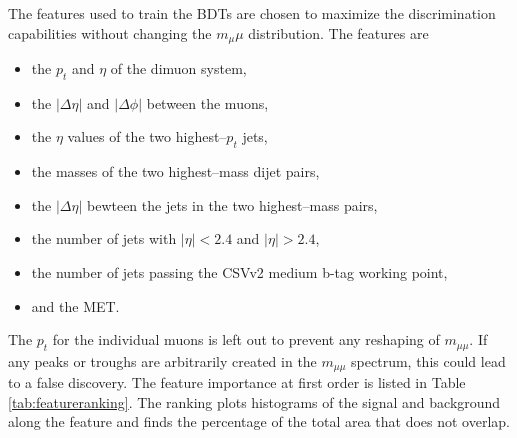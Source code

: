 The features used to train the BDTs are chosen to maximize the discrimination capabilities without changing the $m_\mu\mu$ distribution. The features are
\begin{itemize}
\item the $p_t$ and $\eta$ of the dimuon system, \vspace{-10pt}
\item the $|\Delta\eta|$ and $|\Delta\phi|$ between the muons, \vspace{-10pt}
\item the $\eta$ values of the two highest--$p_t$ jets, \vspace{-10pt}
\item the masses of the two highest--mass dijet pairs, \vspace{-10pt}
\item the $|\Delta\eta|$ bewteen the jets in the two highest--mass pairs, \vspace{-10pt}
\item the number of jets with $|\eta| < 2.4$ and $|\eta| > 2.4$, \vspace{-10pt}
\item the number of jets passing the CSVv2 medium b-tag working point, \vspace{-10pt}
\item and the MET.
\end{itemize}
The $p_t$ for the individual muons is left out to prevent any reshaping of $m_{\mu\mu}$. If any peaks or troughs are arbitrarily created in the $m_{\mu\mu}$ spectrum, this could lead to a false discovery. The feature importance at first order is listed in Table \ref{tab:featureranking}. The ranking plots histograms of the signal and background along the feature and finds the percentage of the total area that does not overlap.
